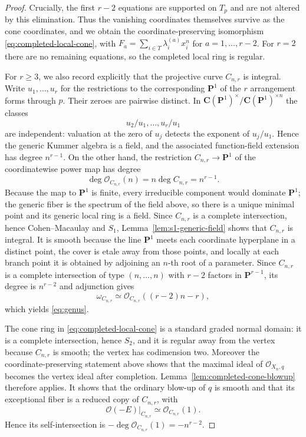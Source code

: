 \documentclass[10pt,a4paper]{amsart}
\newcommand{\CC}{\mathbf C}
\newcommand{\OO}{\mathcal O}
\newcommand{\PP}{\mathbf P}
\begin{document}
\begin{proof}
Crucially, the first $r-2$ equations are supported on $T_p$ and are not altered by
this elimination.  Thus the vanishing coordinates themselves survive as the
cone coordinates, and we obtain the coordinate-preserving isomorphism
\eqref{eq:completed-local-cone}, with
$F_a=\sum_{i\in T}\lambda_i^{(a)}x_i^n$ for $a=1,\ldots,r-2$.
For $r=2$ there are no remaining equations, so the completed local ring is
regular.

For $r\ge3$, we also record explicitly that the projective curve $C_{n,r}$ is
integral.  Write $u_1,\ldots,u_r$ for the restrictions to the corresponding
$\PP^1$ of the $r$ arrangement forms through $p$.  Their zeroes are pairwise
distinct.  In $\CC(\PP^1)^\times/\CC(\PP^1)^{\times n}$ the classes
\[
        u_2/u_1,\ldots,u_r/u_1
\]
are independent: valuation at the zero of $u_j$ detects the exponent of
$u_j/u_1$.  Hence the generic Kummer algebra is a field, and the associated
function-field extension has degree $n^{r-1}$.  On the other hand, the restriction
$C_{n,r}\to\PP^1$ of the coordinatewise power map has degree
\[
        \deg\OO_{C_{n,r}}(n)=n\deg C_{n,r}=n^{r-1}.
\]
Because the map to $\PP^1$ is finite, every irreducible component would dominate
$\PP^1$; the generic fiber is the spectrum of the field above, so there is a
unique minimal point and its generic local ring is a field.  Since $C_{n,r}$ is a
complete intersection, hence Cohen--Macaulay and $S_1$,
Lemma~\ref{lem:s1-generic-field} shows that $C_{n,r}$ is integral.  It is smooth because the line $\PP^1$ meets each
coordinate hyperplane in a distinct point, the cover is etale
away from those points, and locally at each branch point it is obtained by
adjoining an $n$-th root of a parameter.  Since $C_{n,r}$ is a complete
intersection of type $(n,\ldots,n)$ with $r-2$ factors in $\PP^{r-1}$, its degree
is $n^{r-2}$ and adjunction gives
\[
 \omega_{C_{n,r}}\simeq
 \OO_{C_{n,r}}((r-2)n-r),
\]
which yields \eqref{eq:genus}.

The cone ring in \eqref{eq:completed-local-cone} is a standard graded normal
domain: it is a complete intersection, hence $S_2$, and it is regular away from
the vertex because $C_{n,r}$ is smooth; the vertex has codimension two.  Moreover
the coordinate-preserving statement above shows
that the maximal ideal of $\OO_{X_n,q}$ becomes the vertex ideal after
completion.  Lemma~\ref{lem:completed-cone-blowup} therefore applies.  It shows
that the ordinary blow-up of $q$ is smooth and that its exceptional fiber is a
reduced copy of $C_{n,r}$, with
\[
        \OO(-E)|_{C_{n,r}}\simeq\OO_{C_{n,r}}(1).
\]
Hence its self-intersection is
$-\deg\OO_{C_{n,r}}(1)=-n^{r-2}$.
\end{proof}
\end{document}
